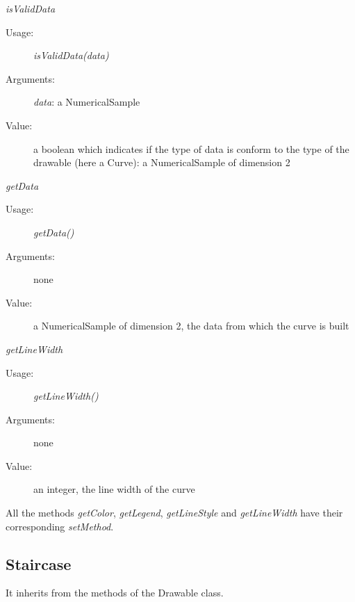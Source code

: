 \begin{description}
\begin{description}
  \item \textit{isValidData}
    \begin{description}
    \item[Usage:] \textit{isValidData(data)}
    \item[Arguments:] \textit{data}: a NumericalSample
    \item[Value:] a boolean which indicates if the type of data is conform to the type of the drawable (here a Curve): a NumericalSample of dimension 2
    \end{description}
    \bigskip
  \item \textit{getData}
    \begin{description}
    \item[Usage:] \textit{getData()}
    \item[Arguments:] none
    \item[Value:] a NumericalSample of dimension 2, the data from which the curve is built
    \end{description}
    \bigskip
  \item \textit{getLineWidth}
    \begin{description}
    \item[Usage:] \textit{getLineWidth()}
    \item[Arguments:] none
    \item[Value:] an integer, the line width  of the curve
    \end{description}
  \end{description}

  All the methods \textit{getColor},  \textit{getLegend}, \textit{getLineStyle} and \textit{getLineWidth} have their corresponding \textit{setMethod}.

\end{description}

\newpage
\subsection{Staircase}


It inherits from the methods of the Drawable class.

